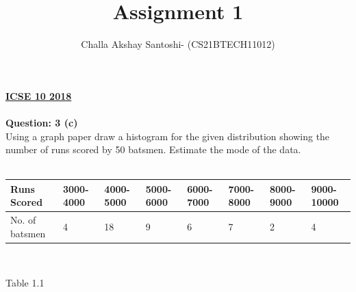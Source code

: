 \documentclass[12pt, a4paper] {article}
\title{Assignment 1}
\author{Challa Akshay Santoshi- (CS21BTECH11012)}
\begin{document}
\maketitle
\textbf{\underline{ICSE 10 2018}}\\\\
\textbf{Question: 3 (c)}\\
Using a graph paper draw a histogram for the given distribution showing the number of runs scored by 50 batsmen. Estimate the mode of the data.\\\\
\setlength{\arrayrulewidth}{0.5mm}
\setlength{\tabcolsep}{18pt}
\renewcommand{\arraystretch}{1.5}
\begin{tabular}{ |p{2cm}|p{0.6cm}|p{0.6cm}|p{0.6cm}|p{0.6cm}|p{0.6cm}|p{0.6cm}|
p{0.6cm}|  }
\hline
Runs Scored & 3000-4000 & 4000-5000 & 5000-6000 & 6000-7000 & 7000-8000 & 8000-9000
& 9000-10000\\
\hline
No. of batsmen & 4 & 18 & 9 & 6 & 7 & 2 & 4 \\
\hline
\end{tabular}\\
\begin{center}
Table 1.1\\
\end{center}
\end{document}
